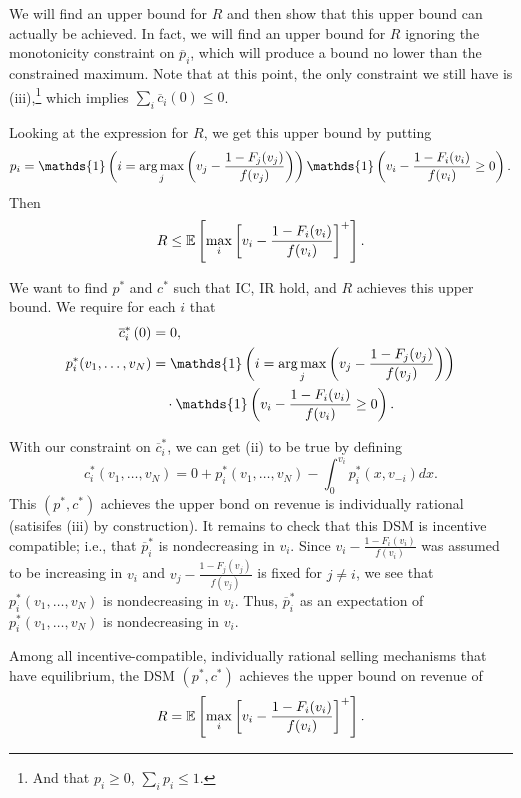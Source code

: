 We will find an upper bound for $R$ and then show that this upper bound can actually be achieved. In fact, we will find an upper bound for $R$ ignoring the monotonicity constraint on $\overline{p}_i$, which will produce a bound no lower than the constrained maximum. Note that at this point, the only constraint we still have is (iii),\footnote{And that $p_i \ge 0$, $\sum_i p_i \le 1$.}
which implies $\sum_i \overline{c}_i(0) \le 0$.

Looking at the expression for $R$, we get this upper bound by putting
\[
	p_i = \mathds{1}\left(i = \argmax_j \left( v_j - \frac{1-F_j(v_j)}{f(v_j)} \right)\right)
	\mathds{1} \left( v_i - \frac{1-F_i(v_i)}{f(v_i)} \ge 0 \right).
\]
Then
\[
	R \le \mathbb{E}\left[\max_i \left[ v_i - \frac{1-F_i(v_i)}{f(v_i)} \right]^{+}\right]
.\]

We want to find $p^*$ and $c^*$ such that IC, IR hold, and $R$ achieves this upper bound.
We require for each $i$ that
\begin{align*}
	\overline{c}_i^*\left(  0 \right) &= 0, \\
	p^*_i(v_1,\ldots,v_N)
	&= \mathds{1}\left(i = \argmax_j \left( v_j - \frac{1-F_j(v_j)}{f(v_j)} \right)\right) \\
	&\quad \cdot \mathds{1} \left( v_i - \frac{1-F_i(v_i)}{f(v_i)} \ge 0 \right).
\end{align*}

With our constraint on $\overline{c}_i^*$, we can get (ii) to be true by defining \[
	c_i^*(v_1,\ldots,v_N) = 0 + p_i^*(v_1,\ldots,v_N) - \int_{0}^{v_i} p_i^*(x,v_{-i})dx 
.\] 
This $(p^*, c^*)$ achieves the upper bond on revenue is individually rational (satisifes (iii) by construction). It remains to check that this DSM is incentive compatible; i.e., that $\overline{p}_i^*$ is nondecreasing in $v_i$. Since $v_i - \frac{1-F_i(v_i)}{f(v_i)}$ was assumed to be increasing in $v_i$ and $v_j - \frac{1-F_j(v_j)}{f(v_j)}$ is fixed for $j \ne i$, we see that $p_i^*(v_1,\ldots,v_N)$ is nondecreasing in $v_i$. Thus, $\overline{p}_i^*$ as an expectation of $p_i^*(v_1,\ldots,v_N)$ is nondecreasing in $v_i$.

Among all incentive-compatible, individually rational selling mechanisms that have equilibrium, the DSM $(p^*,c^*)$ achieves the upper bound on revenue of \[
	R = \mathbb{E}\left[\max_i \left[ v_i - \frac{1-F_i(v_i)}{f(v_i)} \right]^{+}\right] 
.\]


